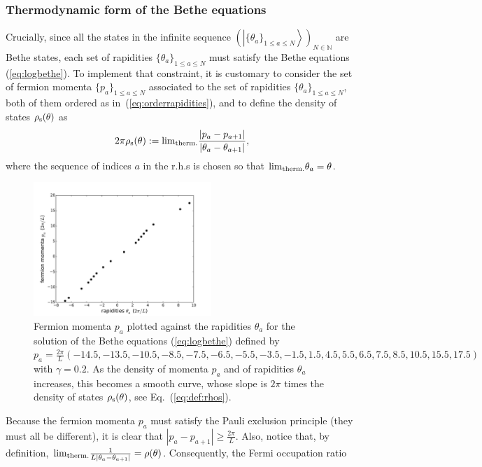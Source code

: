 \documentclass[onecolumn,amsfonts,showpacs,superscriptaddress]{revtex4-1}
\begin{document}
\subsubsection{Thermodynamic form of the Bethe equations}


Crucially, since all the states in the infinite sequence $\left( \left| \{ \theta_a \}_{1 \leq a \leq N} \right> \right)_{N \in \mathbb{N}}$ are Bethe states, each set of rapidities $\{ \theta_a \}_{1 \leq a \leq N}$ must satisfy the Bethe equations (\ref{eq:logbethe}). To implement that constraint, it is customary to consider the set of fermion momenta $\{ p_a \}_{1 \leq a \leq N}$ associated to the set of rapidities $\{ \theta_a \}_{1 \leq a \leq N}$, both of them ordered as in~(\ref{eq:orderrapidities}), and to define the density of states $\rho_{\rm s} (\theta)$ as
\begin{equation}
    \label{eq:def:rhos}
    2 \pi \rho_{\rm s} (\theta) := {\rm lim}_{\rm therm.}  \frac{| p_a - p_{a+1} |}{ | \theta_a - \theta_{a+1} |} ,
\end{equation}
where the sequence of indices $a$ in the r.h.s is chosen so that ${\rm lim}_{\rm therm.}  \theta_a = \theta$.
\begin{figure}[h]
    \centering
    \includegraphics[width=0.6\textwidth]{figures/bethe_rhos.pdf}
    \caption{Fermion momenta $p_a$ plotted against the rapidities $\theta_a$ for the solution of the Bethe equations (\ref{eq:logbethe}) defined by $p_a = \frac{2\pi}{L} (-14.5,-13.5,-10.5,-8.5,-7.5,-6.5,-5.5,-3.5,-1.5,1.5,4.5,5.5,6.5,7.5,8.5,10.5,15.5,17.5)$ with $\gamma=0.2$. As the density of momenta $p_a$ and of rapidities $\theta_a$ increases, this becomes a smooth curve, whose slope is $ 2\pi$ times the density of states $\rho_{\rm s}(\theta)$, see Eq.~(\ref{eq:def:rhos}).}
    \label{fig:bethe_rho_s}
\end{figure}
Because the fermion momenta $p_a$ must satisfy the Pauli exclusion principle (they must all be different), it is clear that $| p_a - p_{a+1}| \geq \frac{2\pi}{L}$. Also, notice that, by definition, ${\rm lim}_{\rm therm.} \frac{1}{L |\theta_a - \theta_{a+1} |} = \rho(\theta)$. Consequently, the Fermi occupation ratio
\end{document}
